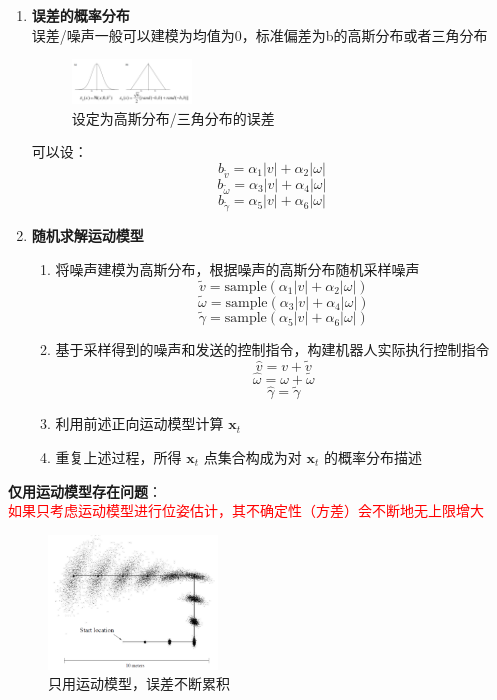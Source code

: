 \documentclass[../main.tex]{subfiles}
\begin{document}
\begin{enumerate}
\begin{enumerate}
        \item \textbf{误差的概率分布}\\
         误差/噪声一般可以建模为均值为0，标准偏差为b的高斯分布或者三角分布
            \begin{figure}[H]
                \centering
                \includegraphics[width=0.3\textwidth]{images/error2.png}
                \caption{设定为高斯分布/三角分布的误差}
            \end{figure}
            可以设：
            $$b_{\widetilde{v}} = \alpha_{1}|v| + \alpha_{2}|\omega|$$
            $$ b_{\widetilde{\omega}} = \alpha_{3}|v| + \alpha_{4}|\omega|$$
            $$b_{\widetilde{\gamma}} = \alpha_{5}|v| + \alpha_{6}|\omega|$$
            
        \item \textbf{随机求解运动模型}
        \begin{enumerate}
            \item 将噪声建模为高斯分布，根据噪声的高斯分布随机采样噪声
            $$\widetilde{v} = \mathrm{sample}(\alpha_1 |v| + \alpha_2 |\omega|)$$
            $$\widetilde{\omega} = \mathrm{sample}(\alpha_3 |v| + \alpha_4 |\omega|)$$
            $$\widetilde{\gamma} = \mathrm{sample}(\alpha_5 |v| + \alpha_6 |\omega|)$$
            \item 基于采样得到的噪声和发送的控制指令，构建机器人实际执行控制指令
            $$\widehat{v} = v + \widetilde{v}$$
            $$\widehat{\omega} = \omega + \widetilde{\omega}$$
            $$\widehat{\gamma} = \widetilde{\gamma}$$
            \item 利用前述正向运动模型计算 $\mathbf{x}_t$
            \item 重复上述过程，所得 $\mathbf{x}_t$ 点集合构成为对 $\mathbf{x}_t$ 的概率分布描述
        \end{enumerate}
\end{enumerate}


        
\vspace{2em}
\textbf{仅用运动模型存在问题}：\\
\textcolor{red}{如果只考虑运动模型进行位姿估计，其不确定性（方差）会不断地无上限增大}
                    \begin{figure}[H]
                    \centering
                    \includegraphics[width=0.4\textwidth]{images/unsure.png}
                    \caption{只用运动模型，误差不断累积}
                \end{figure}

\end{enumerate}
\end{document}
